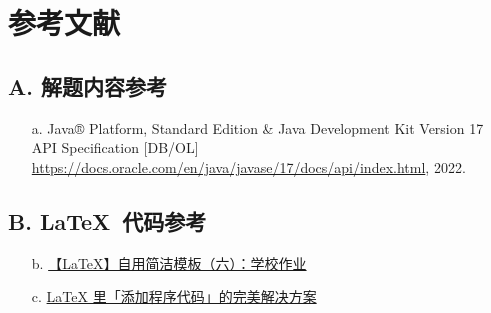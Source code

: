 \chapter{参考文献}

\section{A. 解题内容参考}
\begin{itemize}
    \item[a.] Java® Platform, Standard Edition \& Java Development Kit Version 17 API Specification [DB/OL] \newline 
        \url{https://docs.oracle.com/en/java/javase/17/docs/api/index.html}, 2022. 
\end{itemize}

\section{B. \LaTeX~代码参考}
\begin{itemize}
    \item[b.] \href{https://zhuanlan.zhihu.com/p/385727082}{【LaTeX】自用简洁模板（六）：学校作业} 
    \item[c.] \href{https://zhuanlan.zhihu.com/p/65441079}{LaTeX 里「添加程序代码」的完美解决方案}
\end{itemize}